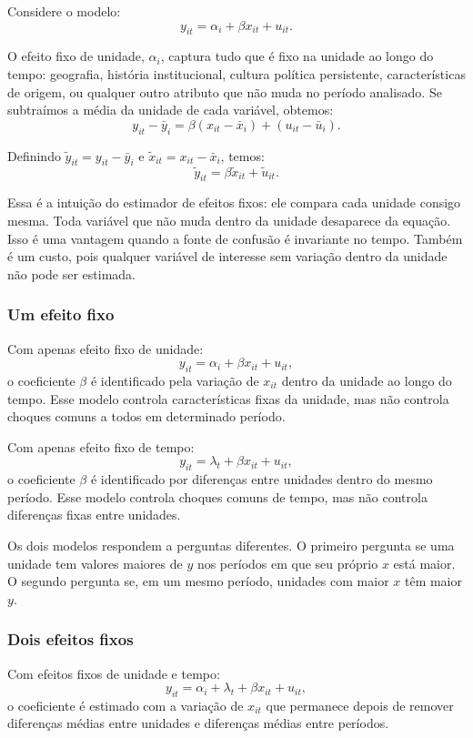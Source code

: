 \documentclass[
]{article}
\begin{document}
Considere o modelo:
\[
y_{it} = \alpha_i + \beta x_{it} + u_{it}.
\]

O efeito fixo de unidade, \(\alpha_i\), captura tudo que é fixo na unidade ao longo do tempo: geografia, história institucional, cultura política persistente, características de origem, ou qualquer outro atributo que não muda no período analisado. Se subtraímos a média da unidade de cada variável, obtemos:
\[
y_{it} - \bar{y}_i = \beta (x_{it} - \bar{x}_i) + (u_{it} - \bar{u}_i).
\]

Definindo \(\tilde{y}_{it} = y_{it} - \bar{y}_i\) e \(\tilde{x}_{it} = x_{it} - \bar{x}_i\), temos:
\[
\tilde{y}_{it} = \beta \tilde{x}_{it} + \tilde{u}_{it}.
\]

Essa é a intuição do estimador de efeitos fixos: ele compara cada unidade consigo mesma. Toda variável que não muda dentro da unidade desaparece da equação. Isso é uma vantagem quando a fonte de confusão é invariante no tempo. Também é um custo, pois qualquer variável de interesse sem variação dentro da unidade não pode ser estimada.

\subsubsection{Um efeito fixo}\label{um-efeito-fixo}

Com apenas efeito fixo de unidade:
\[
y_{it} = \alpha_i + \beta x_{it} + u_{it},
\]
o coeficiente \(\beta\) é identificado pela variação de \(x_{it}\) dentro da unidade ao longo do tempo. Esse modelo controla características fixas da unidade, mas não controla choques comuns a todos em determinado período.

Com apenas efeito fixo de tempo:
\[
y_{it} = \lambda_t + \beta x_{it} + u_{it},
\]
o coeficiente \(\beta\) é identificado por diferenças entre unidades dentro do mesmo período. Esse modelo controla choques comuns de tempo, mas não controla diferenças fixas entre unidades.

Os dois modelos respondem a perguntas diferentes. O primeiro pergunta se uma unidade tem valores maiores de \(y\) nos períodos em que seu próprio \(x\) está maior. O segundo pergunta se, em um mesmo período, unidades com maior \(x\) têm maior \(y\).

\subsubsection{Dois efeitos fixos}\label{dois-efeitos-fixos}

Com efeitos fixos de unidade e tempo:
\[
y_{it} = \alpha_i + \lambda_t + \beta x_{it} + u_{it},
\]
o coeficiente é estimado com a variação de \(x_{it}\) que permanece depois de remover diferenças médias entre unidades e diferenças médias entre períodos.
\end{document}
